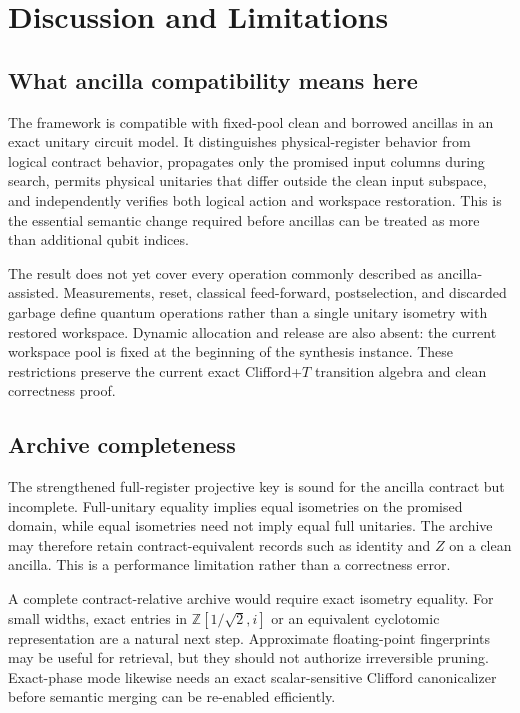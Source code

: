 \section{Discussion and Limitations}

\subsection{What ancilla compatibility means here}

The framework is compatible with fixed-pool clean and borrowed ancillas in an exact unitary circuit model. It distinguishes physical-register behavior from logical contract behavior, propagates only the promised input columns during search, permits physical unitaries that differ outside the clean input subspace, and independently verifies both logical action and workspace restoration. This is the essential semantic change required before ancillas can be treated as more than additional qubit indices.

The result does not yet cover every operation commonly described as ancilla-assisted. Measurements, reset, classical feed-forward, postselection, and discarded garbage define quantum operations rather than a single unitary isometry with restored workspace. Dynamic allocation and release are also absent: the current workspace pool is fixed at the beginning of the synthesis instance. These restrictions preserve the current exact Clifford+$T$ transition algebra and clean correctness proof.

\subsection{Archive completeness}

The strengthened full-register projective key is sound for the ancilla contract but incomplete. Full-unitary equality implies equal isometries on the promised domain, while equal isometries need not imply equal full unitaries. The archive may therefore retain contract-equivalent records such as identity and $Z$ on a clean ancilla. This is a performance limitation rather than a correctness error.

A complete contract-relative archive would require exact isometry equality. For small widths, exact entries in $\mathbb Z[1/\sqrt2,i]$ or an equivalent cyclotomic representation are a natural next step. Approximate floating-point fingerprints may be useful for retrieval, but they should not authorize irreversible pruning. Exact-phase mode likewise needs an exact scalar-sensitive Clifford canonicalizer before semantic merging can be re-enabled efficiently.

